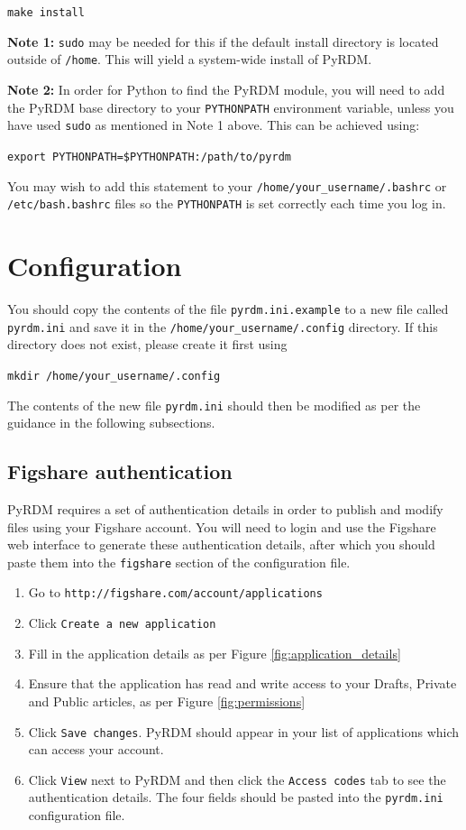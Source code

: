 \documentclass[a4paper,11pt]{report}
\begin{document}
  \texttt{make install}

\textbf{Note 1:} \texttt{sudo} may be needed for this if the default install directory is located outside of \texttt{/home}. This will yield a system-wide install of PyRDM.

\textbf{Note 2:} In order for Python to find the PyRDM module, you will need to add the PyRDM base directory to your \texttt{PYTHONPATH} environment variable, unless you have used \texttt{sudo} as mentioned in Note 1 above. This can be achieved using:

  \texttt{export PYTHONPATH=\$PYTHONPATH:/path/to/pyrdm}

You may wish to add this statement to your \texttt{/home/your\_username/.bashrc} or \texttt{/etc/bash.bashrc} files so the \texttt{PYTHONPATH} is set correctly each time you log in.

\section{Configuration}
You should copy the contents of the file \texttt{pyrdm.ini.example} to a new file called \texttt{pyrdm.ini} and save it in the \texttt{/home/your\_username/.config} directory. If this directory does not exist, please create it first using

  \texttt{mkdir /home/your\_username/.config}

The contents of the new file \texttt{pyrdm.ini} should then be modified as per the guidance in the following subsections.

\subsection{Figshare authentication}\label{sect:authentication}
PyRDM requires a set of authentication details in order to publish and modify files using your Figshare account. You will need to login and use the Figshare web interface to generate these authentication details, after which you should paste them into the \texttt{figshare} section of the configuration file.

\begin{enumerate}
  \item Go to \texttt{http://figshare.com/account/applications}
  \item Click \texttt{Create a new application}
  \item Fill in the application details as per Figure \ref{fig:application_details}
  \item Ensure that the application has read and write access to your Drafts, Private and Public articles, as per Figure \ref{fig:permissions}
  \item Click \texttt{Save changes}. PyRDM should appear in your list of applications which can access your account.
  \item Click \texttt{View} next to PyRDM and then click the \texttt{Access codes} tab to see the authentication details. The four fields should be pasted into the \texttt{pyrdm.ini} configuration file.
\end{enumerate}
\end{document}
